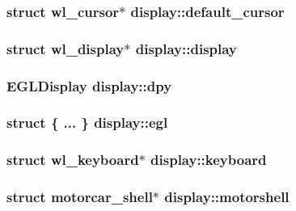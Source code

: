 \hypertarget{structdisplay_a8cf09ba12cb9ca8cbfa28cf6ca7b668a}{
\subsubsection[{default\-\_\-cursor}]{\setlength{\rightskip}{0pt plus 5cm}struct wl\-\_\-cursor$\ast$ display\-::default\-\_\-cursor}}\label{structdisplay_a8cf09ba12cb9ca8cbfa28cf6ca7b668a}
\hypertarget{structdisplay_aa8faf09631925e9221fd8a0c086ce75a}{
\subsubsection[{display}]{\setlength{\rightskip}{0pt plus 5cm}struct wl\-\_\-display$\ast$ display\-::display}}\label{structdisplay_aa8faf09631925e9221fd8a0c086ce75a}
\hypertarget{structdisplay_a8a1cbda15a286e41e89a85f158ce9311}{
\subsubsection[{dpy}]{\setlength{\rightskip}{0pt plus 5cm}E\-G\-L\-Display display\-::dpy}}\label{structdisplay_a8a1cbda15a286e41e89a85f158ce9311}
\hypertarget{structdisplay_a8b8bc104c19ff228d476a377e572d9c7}{
\subsubsection[{egl}]{\setlength{\rightskip}{0pt plus 5cm}struct \{ ... \}   display\-::egl}}\label{structdisplay_a8b8bc104c19ff228d476a377e572d9c7}
\hypertarget{structdisplay_a06233e290c4ac294617401b22421691d}{
\subsubsection[{keyboard}]{\setlength{\rightskip}{0pt plus 5cm}struct wl\-\_\-keyboard$\ast$ display\-::keyboard}}\label{structdisplay_a06233e290c4ac294617401b22421691d}
\hypertarget{structdisplay_a0ad2d912a47f21acc312105e1458df68}{
\subsubsection[{motorshell}]{\setlength{\rightskip}{0pt plus 5cm}struct motorcar\-\_\-shell$\ast$ display\-::motorshell}}\label{structdisplay_a0ad2d912a47f21acc312105e1458df68}
